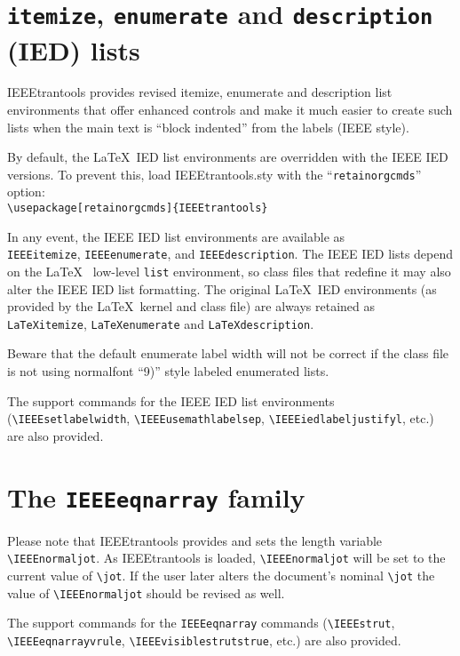 \documentclass[pagesize=auto]{scrartcl}
\begin{document}
\section{\texttt{itemize}, \texttt{enumerate} and \texttt{description} (IED) lists}

\textsf{IEEEtrantools} provides revised itemize, enumerate and description list
environments that offer enhanced controls and make it much easier to
create such lists when the main text is ``block indented'' from the 
labels (IEEE style).

By default, the \LaTeX\ IED list environments are overridden with the IEEE
IED versions. To prevent this, load \textsf{IEEEtrantools.sty} with the
``\texttt{retainorgcmds}'' option:\\
\verb+\usepackage[retainorgcmds]{IEEEtrantools}+

In any event, the IEEE IED list environments are available as\\ \texttt{IEEEitemize},
\texttt{IEEEenumerate}, and \texttt{IEEEdescription}. The IEEE IED lists depend on the \LaTeX\ %
low-level \texttt{list} environment, so class files that redefine it may also alter
the IEEE IED list formatting. The original \LaTeX\ IED environments (as
provided by the \LaTeX\ kernel and class file) are always retained as
\texttt{LaTeXitemize}, \texttt{LaTeXenumerate} and \texttt{LaTeXdescription}.

Beware that the default enumerate label width will not be correct if
the class file is not using normalfont ``9)'' style labeled enumerated lists.

The support commands for the IEEE IED list environments (\verb+\IEEEsetlabelwidth+,
\verb+\IEEEusemathlabelsep+, \verb+\IEEEiedlabeljustifyl+, etc.) are also provided.


\section{The \texttt{IEEEeqnarray} family}

Please note that \textsf{IEEEtrantools} provides and sets the length variable
\verb+\IEEEnormaljot+. As IEEEtrantools is loaded, \verb+\IEEEnormaljot+ will be set to
the current value of \verb+\jot+. If the user later alters the document's nominal
\verb+\jot+ the value of \verb+\IEEEnormaljot+ should be revised as well.

The support commands for the \texttt{IEEEeqnarray} commands (\verb+\IEEEstrut+,\\ 
\verb+\IEEEeqnarrayvrule+, \verb+\IEEEvisiblestrutstrue+, etc.) are also provided.
\end{document}
